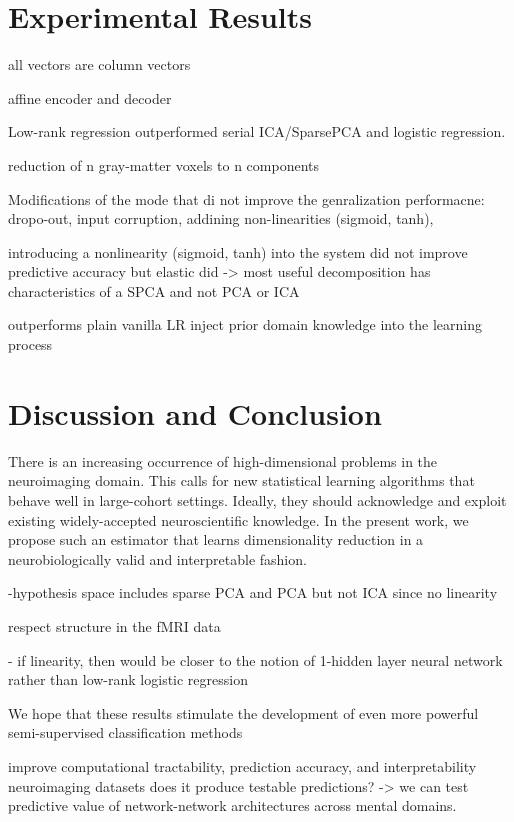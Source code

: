 \documentclass{article} %
\begin{document}
\section{Experimental Results}


all vectors are column vectors

affine encoder and decoder

Low-rank regression outperformed serial ICA/SparsePCA and logistic regression.

reduction of n gray-matter voxels to n components





Modifications of the mode that di not improve the genralization performacne:
dropo-out, input corruption, addining non-linearities (sigmoid, tanh),


introducing a
nonlinearity (sigmoid, tanh) into the system did not improve predictive accuracy but
elastic did -> most useful decomposition has characteristics of a SPCA
and not PCA or ICA

outperforms plain vanilla LR
inject prior domain knowledge into the learning process





\section{Discussion and Conclusion}
%
There is an increasing occurrence of high-dimensional problems in the
neuroimaging domain. This calls for new statistical learning algorithms that
behave well in large-cohort settings. Ideally, they should acknowledge
and exploit existing widely-accepted neuroscientific knowledge.
In the present work, we propose such an estimator that learns
dimensionality reduction
in a neurobiologically valid and interpretable fashion.

-hypothesis space includes sparse PCA and PCA but not ICA since no
linearity

respect structure in the fMRI data


- if linearity, then would be closer to the notion of 1-hidden layer neural
network rather than low-rank logistic regression



We hope that these results stimulate the development of
even more powerful semi-supervised classification methods


improve computational tractability, prediction accuracy, and interpretability
neuroimaging datasets
does it produce testable predictions?
-> we can test predictive value of network-network architectures across
mental domains.
\end{document}
